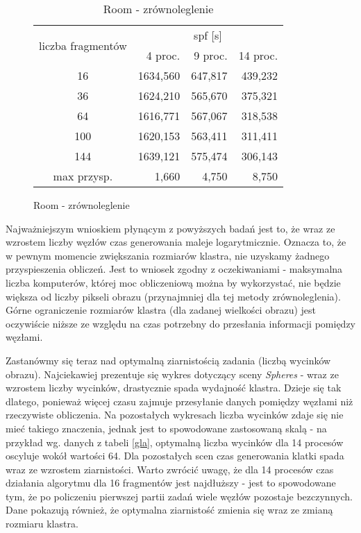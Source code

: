 \vspace*{-6mm}
\begin{figure}[H]
\begin{longtable}{|c|r|r|r|}
		\caption{Room - zrównoleglenie} \\ \hline
	    \multirow{2}{*}{liczba fragmentów} & \multicolumn{3}{|c|}{spf [s]} \\ \cline{2-4}
	 	& 4 proc. & 9 proc. & 14 proc. \\ \hline
	    16 & 1634,560 & 647,817 & 439,232 \\ 
	    36 & 1624,210 & 565,670 & 375,321 \\
		64 & 1616,771 & 567,067 & 318,538 \\
		100 & 1620,153 & 563,411 & 311,411 \\
		144 & 1639,121 & 575,474 & 306,143 \\ \hline
		max przysp. & 1,660 & 4,750 & 8,750  \\
		\hline
\end{longtable}
\end{figure}

Najważniejszym wnioskiem płynącym z powyższych badań jest to, że wraz ze wzrostem liczby węzłów czas generowania maleje logarytmicznie. Oznacza to, że w pewnym momencie zwiększania rozmiarów klastra, nie uzyskamy żadnego przyspieszenia obliczeń. Jest to wniosek zgodny z oczekiwaniami - maksymalna liczba komputerów, której moc obliczeniową można by wykorzystać, nie będzie większa od liczby pikseli obrazu (przynajmniej dla tej metody zrównoleglenia). Górne ograniczenie rozmiarów klastra (dla zadanej wielkości obrazu) jest oczywiście niższe ze względu na czas potrzebny do przesłania informacji pomiędzy węzłami.

Zastanówmy się teraz nad optymalną ziarnistością zadania (liczbą wycinków obrazu). Najciekawiej prezentuje się wykres dotyczący sceny \emph{Spheres} - wraz ze wzrostem liczby wycinków, drastycznie spada wydajność klastra. Dzieje się tak dlatego, ponieważ więcej czasu zajmuje przesyłanie danych pomiędzy węzłami niż rzeczywiste obliczenia. Na pozostałych wykresach liczba wycinków zdaje się nie mieć takiego znaczenia, jednak jest to spowodowane zastosowaną skalą - na przykład wg. danych z tabeli \ref{gla}, optymalną liczba wycinków dla 14 procesów oscyluje wokół wartości 64. Dla pozostałych scen czas generowania klatki spada wraz ze wzrostem ziarnistości. Warto zwrócić uwagę, że dla 14 procesów czas działania algorytmu dla 16 fragmentów jest najdłuższy - jest to spowodowane tym, że po policzeniu pierwszej partii zadań wiele węzłów pozostaje bezczynnych. Dane pokazują również, że optymalna ziarnistość zmienia się wraz ze zmianą rozmiaru klastra.

